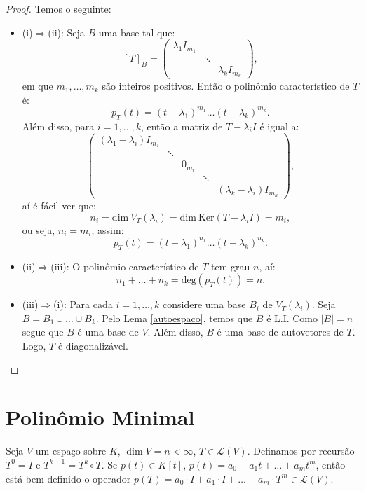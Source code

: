 \documentclass[11pt,twoside,a4paper]{book}
\begin{document}
\begin{proof}
Temos o seguinte:
\begin{itemize}
\item (i)$\Rightarrow$(ii): Seja $B$ uma base tal que:
\[
[T]_B=\begin{pmatrix}
\lambda_1I_{m_1}&&\\&\ddots&\\&&\lambda_kI_{m_k}
\end{pmatrix},
\]
em que $m_1,\dots,m_k$ são inteiros positivos. Então o polinômio característico de $T$ é:
\[
p_T(t)=(t-\lambda_1)^{m_1}\ldots(t-\lambda_k)^{m_k}.
\]
Além disso, para $i=1,\dots,k$, então a matriz de $T-\lambda_iI$ é igual a:
\[
\begin{pmatrix}
(\lambda_1-\lambda_i)I_{m_1}&&&&\\&\ddots&&&\\&&0_{m_i}&&\\&&&\ddots&\\&&&&(\lambda_k-\lambda_i)I_{m_k}
\end{pmatrix},
\]
aí é fácil ver que:
\[
n_i=\mathrm{dim} \ V_T(\lambda_i)=\mathrm{dim} \ \mathrm{Ker}(T-\lambda_iI)=m_i,
\]
ou seja, $n_i=m_i$; assim:
\[
p_T(t)=(t-\lambda_1)^{n_1}\ldots(t-\lambda_k)^{n_k}.
\]
\item (ii)\(\Rightarrow\)(iii): O polinômio característico de $T$ tem grau $n$, aí:
\[
n_1+\ldots+n_k=\text{deg}(p_T(t))=n.
\]
\item (iii)\(\Rightarrow\)(i): Para cada \(i=1,\dots,k\) considere uma base \(B_i\)
de \(V_T(\lambda_i)\). Seja \(B=B_1\cup\dots\cup B_k\). Pelo Lema \ref{autoespaco},
temos que \(B\) é L.I. Como \(\vert B\vert =n\) segue que \(B\) é uma base de
\(V\). Além disso, \(B\) é uma base de autovetores de \(T\). Logo, \(T\) é diagonalizável.
\end{itemize}
\end{proof}

\section{Polinômio Minimal}

\begin{definicao}
Seja $V$ um espaço sobre $K$, $\dim V=n<\infty$, $T\in\mathcal{L}(V)$. Definamos por recursão $T^0=I$ e $T^{k+1}=T^k\circ T$. Se $p(t)\in K[t]$, $p(t)=a_0+a_1t+\dots+a_mt^m$, então está bem definido o operador $p(T)=a_0\cdot I+a_1\cdot I+\dots+a_m\cdot T^m\in\mathcal{L}(V)$.
\end{definicao}
\end{document}
